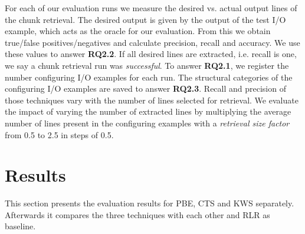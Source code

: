 \documentclass[\myrootdir/main.tex]{subfiles}
\begin{document}
For each of our evaluation runs we measure the desired vs. actual output lines of the chunk retrieval.
The desired output is given by the output of the test I/O example, which acts as the oracle for our evaluation.
From this we obtain true/false positives/negatives and calculate precision, recall and accuracy.
We use these values to answer \textbf{RQ2.2}.
If all desired lines are extracted, i.e. recall is one, we say a chunk retrieval run was \emph{successful}.
To answer \textbf{RQ2.1}, we register the number configuring I/O examples for each run.
The structural categories of the configuring I/O examples are saved to answer \textbf{RQ2.3}.
Recall and precision of those techniques vary with the number of lines selected for retrieval.
We evaluate the impact of varying the number of extracted lines by multiplying the average number of lines present in the configuring examples with a \emph{retrieval size factor} from 0.5 to 2.5 in steps of 0.5.


\section{Results}
This section presents the evaluation results for PBE, CTS and KWS separately.
Afterwards it compares the three techniques with each other and RLR as baseline.


\end{document}
